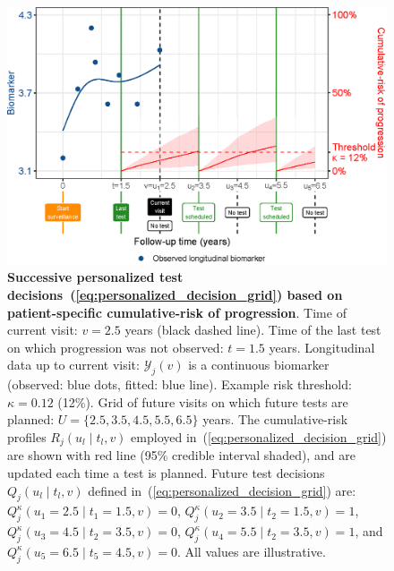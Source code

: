 \documentclass[useAMS, usenatbib, referee]{biom}
\begin{document}
\begin{figure}
\centerline{\includegraphics{schedule_explanation_102.eps}}
\caption{\textbf{Successive personalized test decisions~(\ref{eq:personalized_decision_grid}) based on patient-specific cumulative-risk of progression}. Time of current visit: $v=2.5$ years (black dashed line). Time of the last test on which progression was not observed: $t=1.5$ years. Longitudinal data up to current visit: $\mathcal{Y}_j(v)$ is a continuous biomarker (observed: blue dots, fitted: blue line). Example risk threshold: $\kappa=0.12$ (12\%). Grid of future visits on which future tests are planned: $U = \{2.5, 3.5, 4.5, 5.5, 6.5\}$ years. The cumulative-risk profiles $R_j(u_l \mid t_l, v)$ employed in~(\ref{eq:personalized_decision_grid}) are shown with red line (95\% credible interval shaded), and are updated each time a test is planned. Future test decisions $Q_j(u_l \mid t_l, v)$ defined in~(\ref{eq:personalized_decision_grid}) are: $Q_j^\kappa(u_1=2.5\mid t_1=1.5,v)=0$, $Q_j^\kappa(u_2=3.5\mid t_2=1.5,v)=1$, $Q_j^\kappa(u_3=4.5\mid t_2=3.5,v)=0$, $Q_j^\kappa(u_4=5.5\mid t_2=3.5,v)=1$, and $Q_j^\kappa(u_5=6.5\mid t_5=4.5,v)=0$. All values are illustrative.} 
\label{fig:schedule_explanation}
\end{figure}
\end{document}
